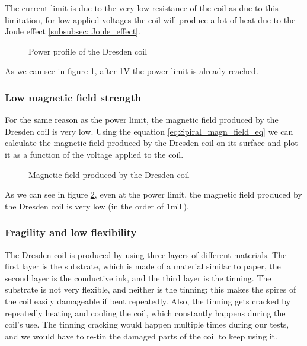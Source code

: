 The current limit is due to the very low resistance of the coil as due to this limitation, for low applied voltages the coil will produce a lot of heat due to the Joule effect \ref{subsubsec: Joule_effect}.

\begin{figure}
    \centering
    \resizebox{0.5\textwidth}{!}{}
    \caption{Power profile of the Dresden coil}
    \label{fig: Dresden_heat_graph}
\end{figure}
As we can see in figure \ref{fig: Dresden_heat_graph}, after 1V the power limit is already reached.

\subsubsection{Low magnetic field strength}
For the same reason as the power limit, the magnetic field produced by the Dresden coil is very low.
Using the equation \ref{eq:Spiral_magn_field_eq} we can calculate the magnetic field produced by the Dresden coil on its surface and plot it as a function of the voltage applied to the coil.
\begin{figure}
    \centering
    \resizebox{0.5\textwidth}{!}{}
    \caption{Magnetic field produced by the Dresden coil}
    \label{fig: Dresden_magnetic_field}
\end{figure}

As we can see in figure \ref{fig: Dresden_magnetic_field}, even at the power limit, the magnetic field produced by the Dresden coil is very low (in the order of 1mT).

\subsubsection{Fragility and low flexibility}
The Dresden coil is produced by using three layers of different materials.
The first layer is the substrate, which is made of a material similar to paper, the second layer is the conductive ink, and the third layer is the tinning.
The substrate is not very flexible, and neither is the tinning;
this makes the spires of the coil easily damageable if bent repeatedly.
Also, the tinning gets cracked by repeatedly heating and cooling the coil, which constantly happens during the coil's use.
The tinning cracking would happen multiple times during our tests, and we would have to re-tin the damaged parts of the coil to keep using it.
